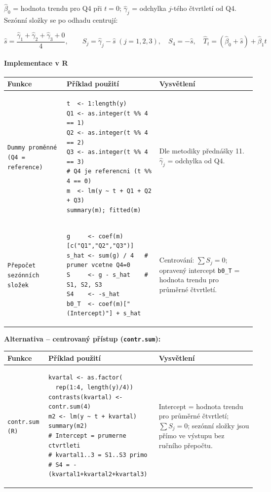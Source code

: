\documentclass[a4paper, 11pt]{article}
\newenvironment{funkcedict}
{%
  \begingroup
  \renewcommand{\arraystretch}{1.4}%
  \lstset{basicstyle=\ttfamily\small, columns=fullflexible}%
  \setlength{\tabcolsep}{4pt}%
  \begin{tabular}{p{0.19\textwidth} p{0.38\textwidth} p{0.30\textwidth}}
  \textbf{Funkce} & \textbf{Příklad použití} & \textbf{Vysvětlení} \\
  \midrule
}
{%
  \end{tabular}%
  \endgroup
}
\begin{document}
\medskip
\noindent$\hat\beta_0$ = hodnota trendu pro Q4 při $t=0$;
$\hat\gamma_j$ = odchylka $j$-tého čtvrtletí od Q4.
Sezónní složky se po odhadu centrují:

\begin{equation*}
	\hat{s} = \frac{\hat\gamma_1 + \hat\gamma_2 + \hat\gamma_3 + 0}{4},
	\qquad
	S_j = \hat\gamma_j - \hat{s}\;(j=1,2,3),
	\quad
	S_4 = -\hat{s},
	\quad
	\hat{T}_t = (\hat\beta_0 + \hat{s}) + \hat\beta_1 t
\end{equation*}

\paragraph{Implementace v R}\mbox{}\par

\begin{funkcedict}

	\texttt{Dummy proměnné (Q4 = reference)} &
	\begin{lstlisting}
t  <- 1:length(y)
Q1 <- as.integer(t %% 4 == 1)
Q2 <- as.integer(t %% 4 == 2)
Q3 <- as.integer(t %% 4 == 3)
# Q4 je referencni (t %% 4 == 0)
m  <- lm(y ~ t + Q1 + Q2 + Q3)
summary(m); fitted(m)
	\end{lstlisting}
	& Dle metodiky přednášky 11. $\hat\gamma_j$ = odchylka od Q4. \\

	\texttt{Přepočet sezónních složek} &
	\begin{lstlisting}
g     <- coef(m)[c("Q1","Q2","Q3")]
s_hat <- sum(g) / 4   # prumer vcetne Q4=0
S     <- g - s_hat    # S1, S2, S3
S4    <- -s_hat
b0_T  <- coef(m)["(Intercept)"] + s_hat
	\end{lstlisting}
	& Centrování: $\sum S_j = 0$; opravený intercept \texttt{b0\_T} = hodnota trendu pro průměrné čtvrtletí. \\

\end{funkcedict}

\medskip
\noindent\textbf{Alternativa -- centrovaný přístup (\texttt{contr.sum}):}

\begin{funkcedict}

	\texttt{contr.sum (R)} &
	\begin{lstlisting}
kvartal <- as.factor(
  rep(1:4, length(y)/4))
contrasts(kvartal) <- contr.sum(4)
m2 <- lm(y ~ t + kvartal)
summary(m2)
# Intercept = prumerne ctvrtleti
# kvartal1..3 = S1..S3 primo
# S4 = -(kvartal1+kvartal2+kvartal3)
	\end{lstlisting}
	& Intercept = hodnota trendu pro průměrné čtvrtletí; $\sum S_j = 0$; sezónní složky jsou přímo ve výstupu bez ručního přepočtu. \\

\end{funkcedict}
\end{document}

